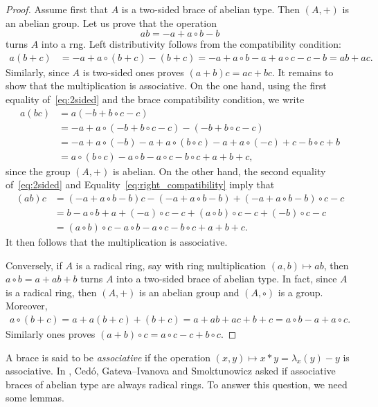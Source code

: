 \begin{proof}
    Assume first that $A$ is a two-sided brace of abelian type. Then $(A,+)$ is an abelian group. 
    Let us prove that the operation
    \[
    ab=-a+a\circ b-b
    \]
    turns $A$ into a rng. Left distributivity follows from the compatibility condition:
    \begin{align*}
    a(b+c)&=-a+a\circ (b+c)-(b+c)
    =-a+a\circ b-a+a\circ c-c-b=ab+ac.
    \end{align*}
    Similarly, since $A$ is two-sided ones proves $(a+b)c=ac+bc$. It remains to show that the multiplication
    is associative. On the one hand, using the first equality of~\eqref{eq:2sided} 
    and the brace compatibility condition, we write
    \begin{align*}
    a(bc)&=a(-b+b\circ c-c)\\
    &=-a+a\circ(-b+b\circ c-c)-(-b+b\circ c-c)\\
    &=-a+a\circ (-b)-a+a\circ(b\circ c)-a+a\circ (-c)+c-b\circ c+b\\
    &=a\circ (b\circ c)-a\circ b-a\circ c-b\circ c+a+b+c,
    \end{align*}
    since the group $(A,+)$ is abelian. On the other hand, the second equality of~\eqref{eq:2sided} and
    Equality~\eqref{eq:right_compatibility} imply that
    \begin{align*}
    (ab)c &= (-a+a\circ b-b)c-(-a+a\circ b-b)+(-a+a\circ b-b)\circ c-c\\
    &=b-a\circ b+a+(-a)\circ c-c+(a\circ b)\circ c-c+(-b)\circ c-c\\
    &=(a\circ b)\circ c-a\circ b-a\circ c-b\circ c+a+b+c.
    \end{align*}
    It then follows that the multiplication is associative. 
    
    Conversely, if $A$ is a radical ring, say with ring multiplication $(a,b)\mapsto ab$, 
    then $a\circ b=a+ab+b$ turns $A$ into a two-sided brace 
    of abelian type. In fact, since $A$ is a radical ring, then 
    $(A,+)$ is an abelian group and $(A,\circ)$ is a group. Moreover, 
    \begin{align*}
        a\circ (b+c)=a+a(b+c)+(b+c)=a+ab+ac+b+c=a\circ b-a+a\circ c.
    \end{align*}
    Similarly ones proves $(a+b)\circ c=a\circ c-c+b\circ c$.
\end{proof}

A brace is said to be \emph{associative} if the operation $(x,y)\mapsto
x*y=\lambda_x(y)-y$ is associative. In \cite[Question 2.1(2)]{MR3818285}, 
Cedó, Gateva--Ivanova and Smoktunowicz asked if associative braces of abelian type are always radical rings. 
To answer this question, we need some lemmas. 

